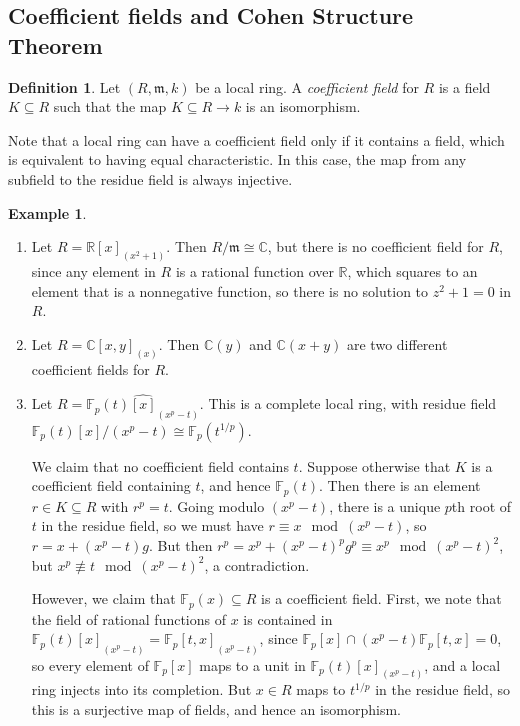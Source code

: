 \documentclass{amsart}[12pt]
\newcommand{\R}{{\mathbb{R}}}
\newcommand{\F}{\mathbb{F}}
\newcommand{\C}{\mathbb{C}}
\newcommand{\fm}{{\mathfrak m}}
\numberwithin{equation}{section}
\theoremstyle{plain} %
\theoremstyle{definition}
\newtheorem{defn}[equation]{Definition}
\newtheorem{ex}[equation]{Example}
\theoremstyle{remark}
\begin{document}
\subsection{Coefficient fields and Cohen Structure Theorem}

\begin{defn} Let $(R,\fm,k)$ be a local ring. A \emph{coefficient field} for $R$ is a field $K\subseteq R$ such that the map $K\subseteq R \to k$ is an isomorphism.
\end{defn}

Note that a local ring can have a coefficient field only if it contains a field, which is equivalent to having equal characteristic. In this case, the map from any subfield to the residue field is always injective.

\begin{ex}
\begin{enumerate}
\item Let $R=\R[x]_{(x^2+1)}$. Then $R/\fm\cong \C$, but there is no coefficient field for $R$, since any element in $R$ is a rational function over $\R$, which squares to an element that is a nonnegative function, so there is no solution to $z^2+1=0$ in $R$.
\item Let $R=\C[x,y]_{(x)}$. Then $\C(y)$ and $\C(x+y)$ are two different coefficient fields for $R$.
\item Let $R=\widehat{{\F_p(t)[x]}_{(x^p-t)}}$. This is a complete local ring, with residue field $\F_p(t)[x]/(x^p-t)\cong \F_p(t^{1/p})$.

We claim that no coefficient field contains $t$. Suppose otherwise that $K$ is a coefficient field containing $t$, and hence $\F_p(t)$. Then there is an element $r\in K\subseteq R$ with $r^p=t$. Going modulo $(x^p-t)$, there is a unique $p$th root of $t$ in the residue field, so we must have $r \equiv x \mod(x^p-t)$, so $r = x + (x^p-t)g$. But then $r^p=x^p+ (x^p-t)^p g^p \equiv x^p \mod (x^p-t)^2$, but $x^p\not\equiv t \mod (x^p-t)^2$, a contradiction.

However, we claim that $\F_p(x) \subseteq R$ is a coefficient field. First, we note that the field of rational functions of $x$ is contained in ${\F_p(t)[x]}_{(x^p-t)}= {\F_p[t,x]}_{(x^p-t)}$, since $\F_p[x] \cap (x^p-t)\F_p[t,x]=0$, so every element of $\F_p[x]$ maps to a unit in $\F_p(t)[x]_{(x^p-t)}$, and a local ring injects into its completion. But $x\in R$ maps to $t^{1/p}$ in the residue field, so this is a surjective map of fields, and hence an isomorphism.
\end{enumerate}
\end{ex}
\end{document}
